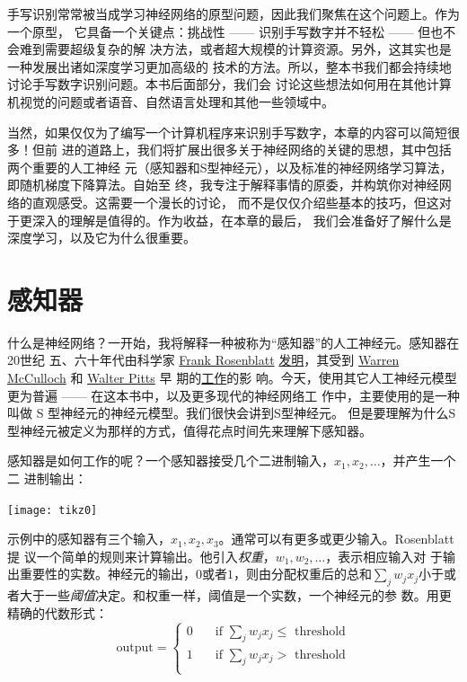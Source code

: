 手写识别常常被当成学习神经网络的原型问题，因此我们聚焦在这个问题上。作为一个原型，
它具备一个关键点：挑战性 —— 识别手写数字并不轻松 —— 但也不会难到需要超级复杂的解
决方法，或者超大规模的计算资源。另外，这其实也是一种发展出诸如深度学习更加高级的
技术的方法。所以，整本书我们都会持续地讨论手写数字识别问题。本书后面部分，我们会
讨论这些想法如何用在其他计算机视觉的问题或者语音、自然语言处理和其他一些领域中。

当然，如果仅仅为了编写一个计算机程序来识别手写数字，本章的内容可以简短很多！但前
进的道路上，我们将扩展出很多关于神经网络的关键的思想，其中包括两个重要的人工神经
元（感知器和S型神经元），以及标准的神经网络学习算法，即随机梯度下降算法。自始至
终，我专注于解释事情的原委，并构筑你对神经网络的直观感受。这需要一个漫长的讨论，
而不是仅仅介绍些基本的技巧，但这对于更深入的理解是值得的。作为收益，在本章的最后，
我们会准备好了解什么是深度学习，以及它为什么很重要。

\section{感知器}
\label{sec:Perceptrons}

什么是神经网络？一开始，我将解释一种被称为“感知器”的人工神经元。感知器在20世纪
五、六十年代由科学家 \href{http://en.wikipedia.org/wiki/Frank_Rosenblatt}{Frank
  Rosenblatt}
\href{http://books.google.ca/books/about/Principles_of_neurodynamics.html?id=7FhRAAAAMAAJ}{
  发明}，其受到 \href{http://en.wikipedia.org/wiki/Warren_McCulloch}{Warren
  McCulloch} 和 \href{http://en.wikipedia.org/wiki/Walter_Pitts}{Walter Pitts} 早
期的\href{http://scholar.google.ca/scholar?cluster=4035975255085082870}{工作}的影
响。今天，使用其它人工神经元模型更为普遍 —— 在这本书中，以及更多现代的神经网络工
作中，主要使用的是一种叫做 S 型神经元的神经元模型。我们很快会讲到S型神经元。
但是要理解为什么S型神经元被定义为那样的方式，值得花点时间先来理解下感知器。

感知器是如何工作的呢？一个感知器接受几个二进制输入，$x_1,x_2,\ldots$，并产生一个二
进制输出：
\begin{center}
  \texttt{[image: tikz0]}
\end{center}

示例中的感知器有三个输入，$x_1,x_2,x_3$。通常可以有更多或更少输入。Rosenblatt 提
议一个简单的规则来计算输出。他引入\emph{权重}，$w_1,w_2,\ldots$，表示相应输入对
于输出重要性的实数。神经元的输出，$0$或者$1$，则由分配权重后的总和$\sum_j w_j
x_j$小于或者大于一些\emph{阈值}决定。和权重一样，阈值是一个实数，一个神经元的参
数。用更精确的代数形式：
\begin{equation}
  \text{output} = \begin{cases}
    0 & \quad \text{if } \sum_j w_j x_j \leq \text{ threshold} \\
    1 & \quad \text{if } \sum_j w_j x_j > \text{ threshold} \\
  \end{cases}
  \tag{1}
\end{equation}

